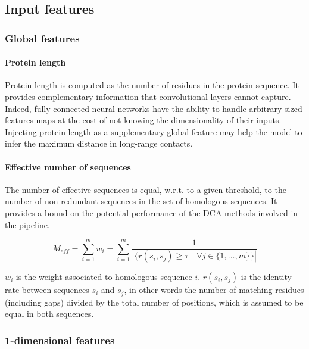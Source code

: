 \subsection{Input features} \label{inputfeatures}

    \subsubsection{Global features}

        \paragraph{Protein length}

      	    Protein length is computed as the number of residues in the protein sequence.
    	    It provides complementary information that convolutional layers cannot capture.
     	    Indeed, fully-connected neural networks have the ability to handle arbitrary-sized
    	    features maps at the cost of not knowing the dimensionality of their inputs.
    	    Injecting protein length as a supplementary global feature may help the model
    	    to infer the maximum distance in long-range contacts.

	   \paragraph{Effective number of sequences} \label{meff}

    	    The number of effective sequences is equal, w.r.t. to a given threshold,
    	    to the number of non-redundant sequences in the set of homologous sequences.
    	    It provides a bound on the potential performance of the DCA methods involved
    	    in the pipeline.

            \begin{equation}
                M_{eff} = \sum_{i=1}^m w_i = \sum_{i=1}^m \frac{1}{|\{r(s_i, s_j) \ge \tau \quad \forall j \in \{1, \dotsc, m\}\}|}
            \end{equation}

            $w_i$ is the weight associated to homologous sequence $i$.
            $r(s_i, s_j)$ is the identity rate between sequences $s_i$ and $s_j$, in other words
            the number of matching residues (including gaps) divided by the total number of positions,
            which is assumed to be equal in both sequences.

    \subsubsection{1-dimensional features}

